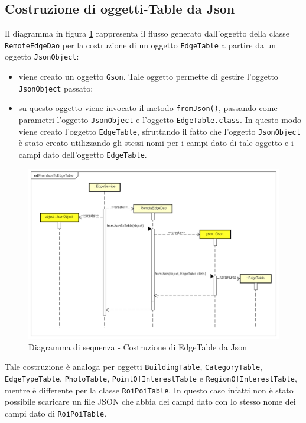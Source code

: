 \documentclass[../DefinizioneDiProdotto.tex]{subfiles}
\begin{document}
	\newpage
	\subsection{Costruzione di oggetti-Table da Json}
	
		Il diagramma in figura \ref{FromJsonToEdgeTable} rappresenta il flusso generato dall'oggetto della classe \verb|RemoteEdgeDao| per la costruzione di un oggetto \verb|EdgeTable| a partire da un oggetto \verb|JsonObject|:
		\begin{itemize}
			\item viene creato un oggetto \verb|Gson|. Tale oggetto permette di gestire l'oggetto \verb|JsonObject| passato;
			\item su questo oggetto viene invocato il metodo \verb|fromJson()|, passando come parametri l'oggetto \verb|JsonObject| e l'oggetto \verb|EdgeTable.class|. In questo modo viene creato l'oggetto \verb|EdgeTable|, sfruttando il fatto che l'oggetto \verb|JsonObject| è stato creato utilizzando gli stessi nomi per i campi dato di tale oggetto e i campi dato dell'oggetto \verb|EdgeTable|.
		\end{itemize}

		\vfill
		\begin{figure} [h]
			\includegraphics[width=\textwidth]{diagrams/FromJsonToEdgeTable}
			\caption{Diagramma di sequenza - Costruzione di EdgeTable da Json}
			\label{FromJsonToEdgeTable}
		\end{figure}

		\vfill	
		
		\newpage		
		
		Tale costruzione è analoga per oggetti \verb|BuildingTable|, \verb|CategoryTable|, \verb|EdgeTypeTable|, \verb|PhotoTable|, \verb|PointOfInterestTable| e \verb|RegionOfInterestTable|, mentre è differente per la classe \verb|RoiPoiTable|. In questo caso infatti non è stato possibile scaricare un file JSON che abbia dei campi dato con lo stesso nome dei campi dato di \verb|RoiPoiTable|. 
		
\end{document}
